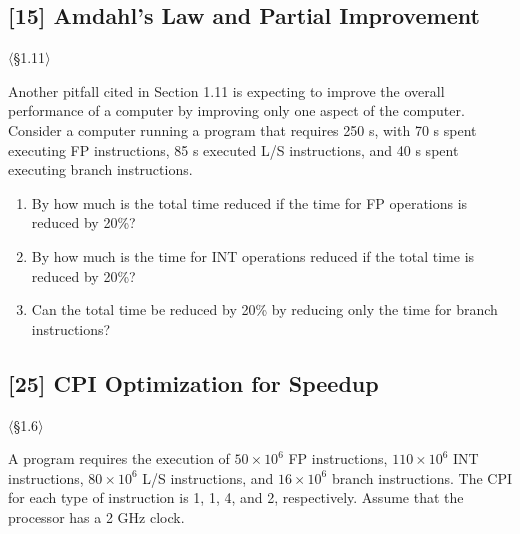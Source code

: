 \problembreak %

\subsection{[15] Amdahl's Law and Partial Improvement}
\hypertarget{prob-1.14}{}
\noindent$\langle$\S1.11$\rangle$\medskip

\noindent Another pitfall cited in Section 1.11 is expecting to improve the overall
performance of a computer by improving only one aspect of the computer.
Consider a computer running a program that requires 250 s, with 70 s spent
executing FP instructions, 85 s executed L/S instructions, and 40 s spent
executing branch instructions.

\begin{enumerate}
  \item[1.14.1] [5] By how much is the total time reduced if the time for FP
        operations is reduced by 20\%?
  \item[1.14.2] [5] By how much is the time for INT operations reduced if the
        total time is reduced by 20\%?
  \item[1.14.3] [5] Can the total time be reduced by 20\% by reducing only the
        time for branch instructions?
\end{enumerate}

\problembreak %

\subsection{[25] CPI Optimization for Speedup}
\hypertarget{prob-1.15}{}
\noindent$\langle$\S1.6$\rangle$\medskip

\noindent A program requires the execution of $50 \times 10^6$ FP instructions,
$110 \times 10^6$ INT instructions, $80 \times 10^6$ L/S instructions, and
$16 \times 10^6$ branch instructions. The CPI for each type of instruction is
1, 1, 4, and 2, respectively. Assume that the processor has a 2 GHz clock.

